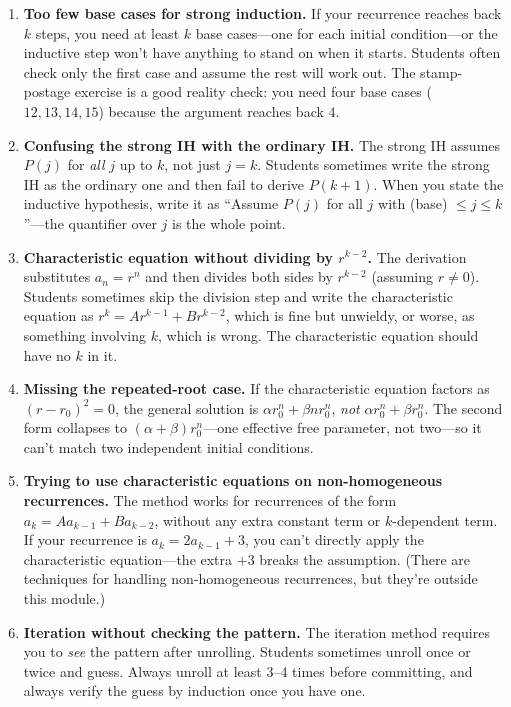 \documentclass[11pt]{article}
\begin{document}
\begin{enumerate}
  \item \textbf{Too few base cases for strong induction.} If your recurrence reaches back $k$ steps, you need at least $k$ base cases---one for each initial condition---or the inductive step won't have anything to stand on when it starts. Students often check only the first case and assume the rest will work out. The stamp-postage exercise is a good reality check: you need four base cases ($12, 13, 14, 15$) because the argument reaches back $4$.
  \item \textbf{Confusing the strong IH with the ordinary IH.} The strong IH assumes $P(j)$ for \emph{all} $j$ up to $k$, not just $j = k$. Students sometimes write the strong IH as the ordinary one and then fail to derive $P(k+1)$. When you state the inductive hypothesis, write it as ``Assume $P(j)$ for all $j$ with (base) $\leq j \leq k$''---the quantifier over $j$ is the whole point.
  \item \textbf{Characteristic equation without dividing by $r^{k-2}$.} The derivation substitutes $a_n = r^n$ and then divides both sides by $r^{k-2}$ (assuming $r \neq 0$). Students sometimes skip the division step and write the characteristic equation as $r^k = A r^{k-1} + B r^{k-2}$, which is fine but unwieldy, or worse, as something involving $k$, which is wrong. The characteristic equation should have no $k$ in it.
  \item \textbf{Missing the repeated-root case.} If the characteristic equation factors as $(r - r_0)^2 = 0$, the general solution is $\alpha r_0^n + \beta n r_0^n$, \emph{not} $\alpha r_0^n + \beta r_0^n$. The second form collapses to $(\alpha + \beta) r_0^n$---one effective free parameter, not two---so it can't match two independent initial conditions.
  \item \textbf{Trying to use characteristic equations on non-homogeneous recurrences.} The method works for recurrences of the form $a_k = A a_{k-1} + B a_{k-2}$, without any extra constant term or $k$-dependent term. If your recurrence is $a_k = 2 a_{k-1} + 3$, you can't directly apply the characteristic equation---the extra $+3$ breaks the assumption. (There are techniques for handling non-homogeneous recurrences, but they're outside this module.)
  \item \textbf{Iteration without checking the pattern.} The iteration method requires you to \emph{see} the pattern after unrolling. Students sometimes unroll once or twice and guess. Always unroll at least 3--4 times before committing, and always verify the guess by induction once you have one.
\end{enumerate}
\end{document}
